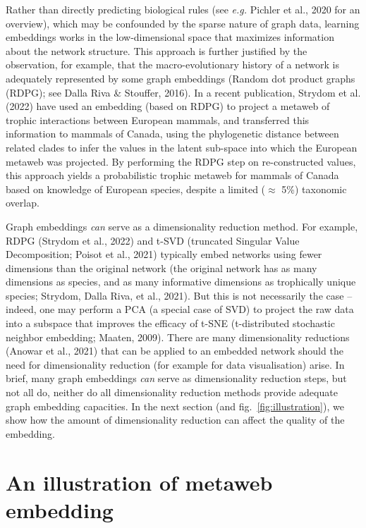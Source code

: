 \documentclass[11pt]{article}
\begin{document}
Rather than directly predicting biological rules (see \emph{e.g.}
Pichler et al., 2020 for an overview), which may be confounded by the
sparse nature of graph data, learning embeddings works in the
low-dimensional space that maximizes information about the network
structure. This approach is further justified by the observation, for
example, that the macro-evolutionary history of a network is adequately
represented by some graph embeddings (Random dot product graphs (RDPG);
see Dalla Riva \& Stouffer, 2016). In a recent publication, Strydom et
al. (2022) have used an embedding (based on RDPG) to project a metaweb
of trophic interactions between European mammals, and transferred this
information to mammals of Canada, using the phylogenetic distance
between related clades to infer the values in the latent sub-space into
which the European metaweb was projected. By performing the RDPG step on
re-constructed values, this approach yields a probabilistic trophic
metaweb for mammals of Canada based on knowledge of European species,
despite a limited (\(\approx\) 5\%) taxonomic overlap.

Graph embeddings \emph{can} serve as a dimensionality reduction method.
For example, RDPG (Strydom et al., 2022) and t-SVD (truncated Singular
Value Decomposition; Poisot et al., 2021) typically embed networks using
fewer dimensions than the original network (the original network has as
many dimensions as species, and as many informative dimensions as
trophically unique species; Strydom, Dalla Riva, et al., 2021). But this
is not necessarily the case -- indeed, one may perform a PCA (a special
case of SVD) to project the raw data into a subspace that improves the
efficacy of t-SNE (t-distributed stochastic neighbor embedding; Maaten,
2009). There are many dimensionality reductions (Anowar et al., 2021)
that can be applied to an embedded network should the need for
dimensionality reduction (for example for data visualisation) arise. In
brief, many graph embeddings \emph{can} serve as dimensionality
reduction steps, but not all do, neither do all dimensionality reduction
methods provide adequate graph embedding capacities. In the next section
(and fig.~\ref{fig:illustration}), we show how the amount of
dimensionality reduction can affect the quality of the embedding.

\hypertarget{an-illustration-of-metaweb-embedding}{%
\section{An illustration of metaweb
embedding}\label{an-illustration-of-metaweb-embedding}}
\end{document}
